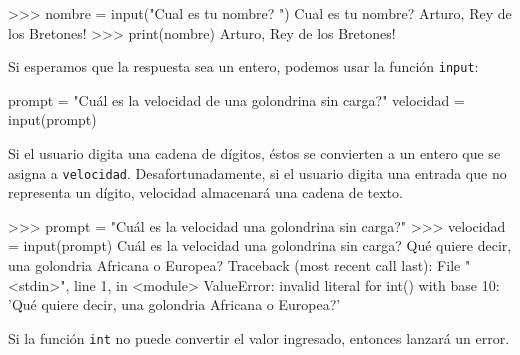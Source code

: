 
\begin{pyconcode}
>>> nombre = input("Cual es tu nombre? ")
Cual es tu nombre? Arturo, Rey de los Bretones!
>>> print(nombre)
Arturo, Rey de los Bretones!
\end{pyconcode}

Si esperamos que la respuesta sea un entero, podemos usar la función
\texttt{input}:

\begin{pyconcode}
prompt = "Cuál es la velocidad de una golondrina sin carga?\n"
velocidad = input(prompt)
\end{pyconcode}
 Si el usuario digita una cadena de dígitos, éstos se convierten a
un entero que se asigna a \texttt{velocidad}. Desafortunadamente,
si el usuario digita una entrada que no representa un dígito, velocidad
almacenará una cadena de texto.

\begin{pyconcode}
>>> prompt = "Cuál es la velocidad una golondrina sin carga?\n"
>>> velocidad = input(prompt)
Cuál es la velocidad una golondrina sin carga?
Qué quiere decir, una golondria Africana o Europea?
Traceback (most recent call last):
File "<stdin>", line 1, in <module>
ValueError: invalid literal for int() with base 10: 'Qué quiere decir, una golondria Africana o Europea?'
\end{pyconcode}


Si la función \texttt{int} no puede convertir el valor ingresado, entonces lanzará un error.

